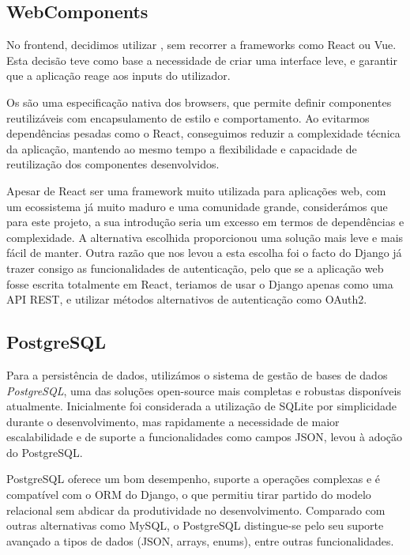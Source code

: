\subsection{WebComponents}

No frontend, decidimos utilizar \textit{\cite{webcomponents}}, sem recorrer a frameworks como React ou Vue. Esta decisão teve como base a necessidade de criar uma interface leve, e garantir que a aplicação reage aos inputs do utilizador. 

Os \textit{\cite{webcomponents}} são uma especificação nativa dos browsers, que permite definir componentes reutilizáveis com encapsulamento de estilo e comportamento. Ao evitarmos dependências pesadas como o React, conseguimos reduzir a complexidade técnica da aplicação, mantendo ao mesmo tempo a flexibilidade e capacidade de reutilização dos componentes desenvolvidos.

Apesar de React ser uma framework muito utilizada para aplicações web,  com um ecossistema já muito maduro e uma comunidade grande, considerámos que para este projeto, a sua introdução seria um excesso em termos de dependências e complexidade. A alternativa escolhida proporcionou uma solução mais leve e mais fácil de manter. Outra razão que nos levou a esta escolha foi o facto do Django já trazer consigo as funcionalidades de autenticação, pelo que se a aplicação web fosse escrita totalmente em React, teriamos de usar o Django apenas como uma API REST, e utilizar métodos alternativos de autenticação como OAuth2.

\subsection{PostgreSQL}

Para a persistência de dados, utilizámos o sistema de gestão de bases de dados \textit{PostgreSQL}, uma das soluções open-source mais completas e robustas disponíveis atualmente. Inicialmente foi considerada a utilização de SQLite por simplicidade durante o desenvolvimento, mas rapidamente a necessidade de maior escalabilidade e de suporte a funcionalidades como campos JSON, levou à adoção do PostgreSQL.

PostgreSQL oferece um bom desempenho, suporte a operações complexas e é compatível com o ORM do Django, o que permitiu tirar partido do modelo relacional sem abdicar da produtividade no desenvolvimento. Comparado com outras alternativas como MySQL, o PostgreSQL distingue-se pelo seu suporte avançado a tipos de dados (\gls{JSON}, arrays, enums), entre outras funcionalidades.

